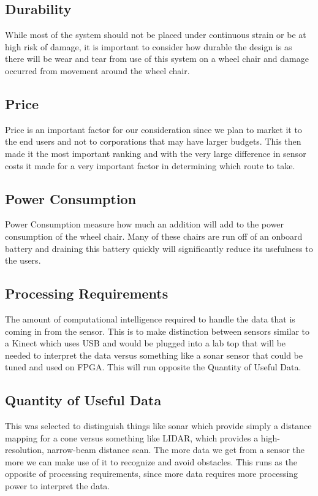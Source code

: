 \documentclass[oneside,final,a4paper]{report}
\begin{document}
\subsection{Durability}
While most of the system should not be placed under continuous strain or be at high risk of damage, it is important to consider how durable the design is as there will be wear and tear from use of this system on a wheel chair and damage occurred from movement around the wheel chair.

\subsection{Price}
Price is an important factor for our consideration since we plan to market it to the end users and not to corporations that may have larger budgets. This then made it the most important ranking and with the very large difference in sensor costs it made for a very important factor in determining which route to take.

\subsection{Power Consumption}
Power Consumption measure how much an addition will add to the power consumption of the wheel chair. Many of these chairs are run off of an onboard battery and draining this battery quickly will significantly reduce its usefulness to the users. 

\subsection{Processing Requirements}
The amount of computational intelligence required to handle the data that is coming in from the sensor. This is to make distinction between sensors similar to a Kinect which uses USB and would be plugged into a lab top that will be needed to interpret the data versus something like a sonar sensor that could be tuned and used on FPGA. This will run opposite the Quantity of Useful Data.

\subsection{Quantity of Useful Data}
This was selected to distinguish things like sonar which provide simply a distance mapping for a cone versus something like LIDAR, which provides a high-resolution, narrow-beam distance scan. The more data we get from a sensor the more we can make use of it to recognize and avoid obstacles. This runs as the opposite of processing requirements, since more data requires more processing power to interpret the data.
\end{document}
